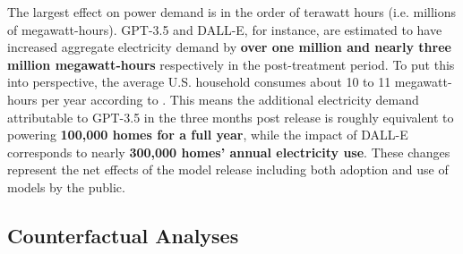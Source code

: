 \documentclass[sigconf,authordraft]{acmart}
\begin{document}
The largest effect on power demand is in the order of terawatt hours (i.e. millions of megawatt-hours). GPT-3.5 and DALL-E, for instance, are estimated to have increased aggregate electricity demand by \textbf{over one million and nearly three million megawatt-hours} respectively in the post-treatment period. To put this into perspective, the average U.S. household consumes about 10 to 11 megawatt-hours per year according to \cite{USHouseholdConsumption}. This means the additional electricity demand attributable to GPT-3.5 in the three months post release is roughly equivalent to powering \textbf{100,000 homes for a full year}, while the impact of DALL-E corresponds to nearly \textbf{300,000 homes’ annual electricity use}. These changes represent the net effects of the model release including both adoption and use of models by the public. %





\subsection{Counterfactual Analyses}
\end{document}
